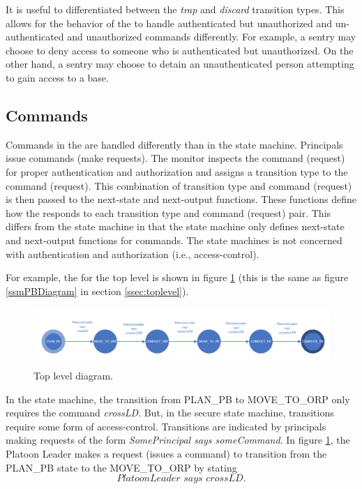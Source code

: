 \documentclass[../../main/main.tex]{subfiles}
\begin{document}
It is useful to differentiated between the \textit{trap} and \textit{discard} transition types.  This allows for the behavior of the  to handle authenticated but unauthorized and un-authenticated and unauthorized commands differently.  For example, a sentry may choose to deny access to someone who is authenticated but unauthorized.  On the other hand, a sentry may choose to detain an unauthenticated person attempting to gain access to a base.

\subsection{Commands}
Commands in the  are handled differently than in the state machine.  Principals issue commands (make requests).  The monitor inspects the command (request) for proper authentication and authorization and assigns a transition type to the command (request).  This combination of transition type and command (request) is then passed to the next-state and next-output functions.  These functions define how the  responds to each transition type and command (request) pair.  This differs from the state machine in that the state machine only defines next-state and next-output functions for commands.  The state machines is not concerned with authentication and authorization (i.e., access-control).

For example, the  for the top level is shown in figure \ref{ssmPBDiagram2} (this is the same as figure \ref{ssmPBDiagram} in section \ref{ssec:toplevel}).  

\begin{figure}[h!]
\centering
\includegraphics[width=\textwidth]{../figures/ssmPBDiagram}
\caption{\label{ssmPBDiagram2} Top level diagram.}
\end{figure}

In the state machine, the transition from PLAN_PB to MOVE_TO_ORP only requires the command \textit{crossLD}.  But, in the secure state machine, transitions require some form of access-control.  Transitions are indicated by principals making requests of the form \textit{SomePrincipal says someCommand}.  In figure \ref{ssmPBDiagram2}, the Platoon Leader makes a request (issues a command) to transition from the PLAN_PB state to the MOVE_TO_ORP by stating 
 \[\textit{PlatoonLeader says crossLD}.\]
\end{document}
